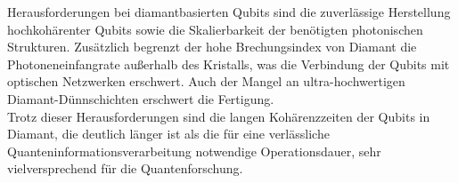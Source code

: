 Herausforderungen  bei diamantbasierten Qubits sind die zuverlässige Herstellung hochkohärenter Qubits sowie die Skalierbarkeit der benötigten photonischen Strukturen. Zusätzlich begrenzt der hohe Brechungsindex von Diamant die Photoneneinfangrate außerhalb des Kristalls, was die Verbindung der Qubits mit optischen Netzwerken erschwert. Auch der Mangel an ultra-hochwertigen Diamant-Dünnschichten erschwert die Fertigung. \\

Trotz dieser Herausforderungen sind die langen Kohärenzzeiten der Qubits in Diamant, die deutlich länger ist als die für eine verlässliche Quanteninformationsverarbeitung notwendige Operationsdauer, sehr vielversprechend für die Quantenforschung. 

\cite{ulanov_diamantbasierte_2025}


\printbibliography
